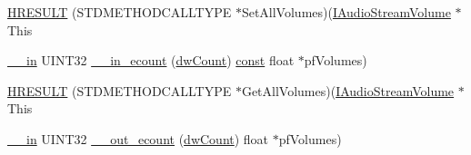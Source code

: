 \begin{DoxyCompactItemize}
\item 
\hyperlink{struct_i_audio_stream_volume_vtbl_a8acedac27960a91591947b00949d0b8f}{H\+R\+E\+S\+U\+LT} (S\+T\+D\+M\+E\+T\+H\+O\+D\+C\+A\+L\+L\+T\+Y\+PE $\ast$Set\+All\+Volumes)(\hyperlink{audioclient_8h_ae2909fedf5fb48235bdf718200c31024}{I\+Audio\+Stream\+Volume} $\ast$This
\item 
\hyperlink{sal_8h_a3f6b8655e1aa9dfc15a9029f0343009e}{\+\_\+\+\_\+in} U\+I\+N\+T32 \hyperlink{struct_i_audio_stream_volume_vtbl_a6f3d54f7901625fdf624ed19476e6699}{\+\_\+\+\_\+in\+\_\+ecount} (\hyperlink{struct_i_audio_stream_volume_vtbl_af2354bd92fa75d7c292aac1170bd8845}{dw\+Count}) \hyperlink{getopt1_8c_a2c212835823e3c54a8ab6d95c652660e}{const} float $\ast$pf\+Volumes)
\item 
\hyperlink{struct_i_audio_stream_volume_vtbl_a89a1650992c3195cd3cfdb2601c8b707}{H\+R\+E\+S\+U\+LT} (S\+T\+D\+M\+E\+T\+H\+O\+D\+C\+A\+L\+L\+T\+Y\+PE $\ast$Get\+All\+Volumes)(\hyperlink{audioclient_8h_ae2909fedf5fb48235bdf718200c31024}{I\+Audio\+Stream\+Volume} $\ast$This
\item 
\hyperlink{sal_8h_a3f6b8655e1aa9dfc15a9029f0343009e}{\+\_\+\+\_\+in} U\+I\+N\+T32 \hyperlink{struct_i_audio_stream_volume_vtbl_a2b240c0cf02ab10b4f0aadcdc4b11a4c}{\+\_\+\+\_\+out\+\_\+ecount} (\hyperlink{struct_i_audio_stream_volume_vtbl_af2354bd92fa75d7c292aac1170bd8845}{dw\+Count}) float $\ast$pf\+Volumes)
\end{DoxyCompactItemize}
